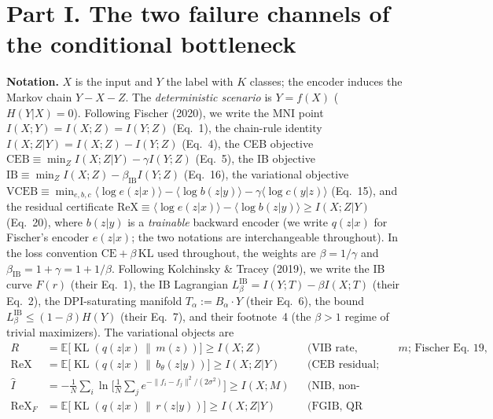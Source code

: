 \newtheorem{lemma}{Lemma}
\newtheorem{proposition}{Proposition}
\newtheorem{corollary}{Corollary}
\newtheorem{remark}{Remark}

\section*{Part I. The two failure channels of the conditional bottleneck}

\textbf{Notation.}
$X$ is the input and $Y$ the label with $K$ classes; the encoder induces the Markov chain
$Y - X - Z$. The \emph{deterministic scenario} is $Y = f(X)$ ($H(Y|X) = 0$). Following
Fischer (2020), we write the MNI point $I(X;Y) = I(X;Z) = I(Y;Z)$ (Eq.~1), the
chain-rule identity $I(X;Z|Y) = I(X;Z) - I(Y;Z)$ (Eq.~4), the CEB objective
$\mathrm{CEB} \equiv \min_Z I(X;Z|Y) - \gamma I(Y;Z)$ (Eq.~5), the IB objective
$\mathrm{IB} \equiv \min_Z I(X;Z) - \beta_{\mathrm{IB}} I(Y;Z)$ (Eq.~16), the
variational objective
$\mathrm{VCEB} \equiv \min_{e,b,c} \langle \log e(z|x)\rangle - \langle \log b(z|y)\rangle
- \gamma \langle \log c(y|z)\rangle$ (Eq.~15), and the residual certificate
$\mathrm{ReX} \equiv \langle \log e(z|x)\rangle - \langle \log b(z|y)\rangle
\ge I(X;Z|Y)$ (Eq.~20), where $b(z|y)$ is a \emph{trainable} backward encoder (we write
$q(z|x)$ for Fischer's encoder $e(z|x)$; the two notations are interchangeable
throughout). In the loss convention $\mathrm{CE} + \beta\,\mathrm{KL}$ used throughout, the weights are
$\beta = 1/\gamma$ and $\beta_{\mathrm{IB}} = 1 + \gamma = 1 + 1/\beta$. Following
Kolchinsky \& Tracey (2019), we write the IB curve $F(r)$ (their Eq.~1), the IB
Lagrangian $L^{\mathrm{IB}}_\beta = I(Y;T) - \beta I(X;T)$ (their Eq.~2), the
DPI-saturating manifold $T_\alpha := B_\alpha \cdot Y$ (their Eq.~6), the bound
$L^{\mathrm{IB}}_\beta \le (1-\beta)H(Y)$ (their Eq.~7), and their footnote~4 (the
$\beta > 1$ regime of trivial maximizers). The variational objects are
\begin{align*}
R &= \mathbb{E}\big[\operatorname{KL}(q(z|x)\,\|\,m(z))\big] \ge I(X;Z)
&&\text{(VIB rate, marginal prior $m$; Fischer Eq.~19, Alemi et al.\ Eq.~14)} \\
\mathrm{ReX} &= \mathbb{E}\big[\operatorname{KL}(q(z|x)\,\|\,b_\theta(z|y))\big]
\ge I(X;Z|Y)
&&\text{(CEB residual; Fischer Eq.~20)} \\
\widehat I &= -\frac{1}{N}\sum_i \ln\Big[\frac{1}{N}\sum_j
e^{-\|f_i-f_j\|^2/(2\sigma^2)}\Big] \ge I(X;M)
&&\text{(NIB, non-parametric; Eq.~16, the homoscedastic case of Eq.~10)} \\
\mathrm{ReX}_F &= \mathbb{E}\big[\operatorname{KL}(q(z|x)\,\|\,r(z|y))\big]
\ge I(X;Z|Y)
&&\text{(FGIB, QR anchor)}
\end{align*}
